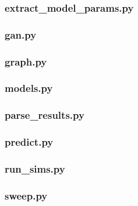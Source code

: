\documentclass[10pt,twocolumn,letterpaper]{article}
\begin{document}
\subsubsection*{extract\_model\_params.py}
\label{code:extract_model_params}


\subsubsection*{gan.py}
\label{code:gan}


\subsubsection*{graph.py}
\label{code:graph}


\subsubsection*{models.py}
\label{code:models}


\subsubsection*{parse\_results.py}
\label{code:parse_results}


\subsubsection*{predict.py}
\label{code:predict}


\subsubsection*{run\_sims.py}
\label{code:run_sims}


\subsubsection*{sweep.py}
\label{code:sweep}


\twocolumn
\end{document}

